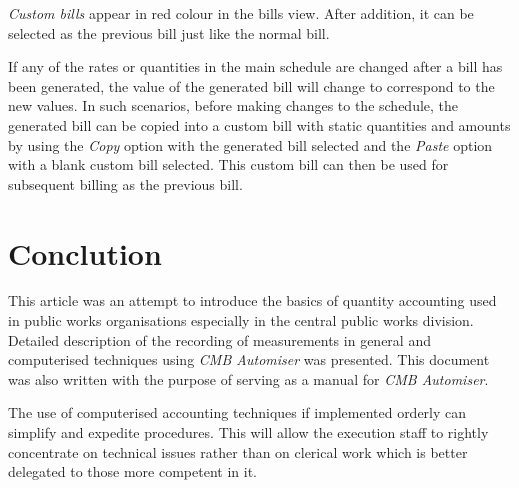 \documentclass[twoside,a4paper]{refart}
\newenvironment{noteblock}[1]%
{\begin{mdframed}[topline=false,bottomline=false, rightline=false,
		linewidth=2pt, frametitle={#1}]}%
		{\end{mdframed}}
\begin{document}
	 \emph{Custom bills} appear in red colour in the bills view. After addition, it can be selected as the previous bill just like the normal bill.\\
	 
	 
	 \begin{noteblock}{Note:}
	 	If any of the rates or quantities in the main schedule are changed after a bill has been generated, the value of the generated bill will change to correspond to the new values. In such scenarios, before making changes to the schedule, the generated bill can be copied into a custom bill with static quantities and amounts by using the \emph{Copy} option with the generated bill selected and the \emph{Paste} option with a blank custom bill selected. This custom bill can then be used for subsequent billing as the previous bill.
	 \end{noteblock}
	 
	 \section{Conclution}
	 
	 This article was an attempt to introduce the basics of quantity accounting used in public works organisations especially in the central public works division. Detailed description of the recording of measurements in general and computerised techniques using \emph{CMB Automiser} was presented. This document was also written with the purpose of serving as a manual for \emph{CMB Automiser}. 
	 
	 The use of computerised accounting techniques if implemented orderly can simplify and expedite procedures. This will allow the execution staff to rightly concentrate on technical issues rather than on clerical work which is better delegated to those more competent in it.
	 
\end{document}
